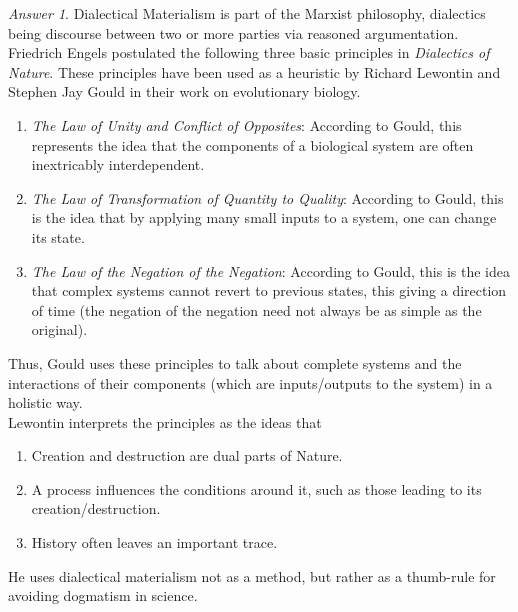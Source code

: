 \documentclass[11pt]{article}
\theoremstyle{remark}
\newtheorem*{answer}{Answer}
\begin{document}
    \begin{answer}
        Dialectical Materialism is part of the Marxist philosophy, dialectics being
        discourse between two or more parties via reasoned argumentation. Friedrich
        Engels postulated the following three basic principles in \emph{Dialectics
        of Nature}. These principles have been used as a heuristic by Richard
        Lewontin and Stephen Jay Gould in their work on evolutionary biology.
        \begin{enumerate}
            \item \emph{The Law of Unity and Conflict of Opposites}: According to
            Gould, this represents the idea that the components of a biological
            system are often inextricably interdependent.

            \item \emph{The Law of Transformation of Quantity to Quality}: According
            to Gould, this is the idea that by applying many small inputs to a
            system, one can change its state.

            \item \emph{The Law of the Negation of the Negation}: According to Gould,
            this is the idea that complex systems cannot revert to previous states,
            this giving a direction of time (the negation of the negation need not
            always be as simple as the original).
        \end{enumerate}

        Thus, Gould uses these principles to talk about complete systems and the
        interactions of their components (which are inputs/outputs to the system) in
        a holistic way. \\

        Lewontin interprets the principles as the ideas that \begin{enumerate}
            \itemsep0em
            \item Creation and destruction are dual parts of Nature.
            \item A process influences the conditions around it, such as those
            leading to its creation/destruction.
            \item History often leaves an important trace.
        \end{enumerate}
        He uses dialectical materialism not as a method, but rather as a thumb-rule
        for avoiding dogmatism in science.
    \end{answer}
\end{document}
